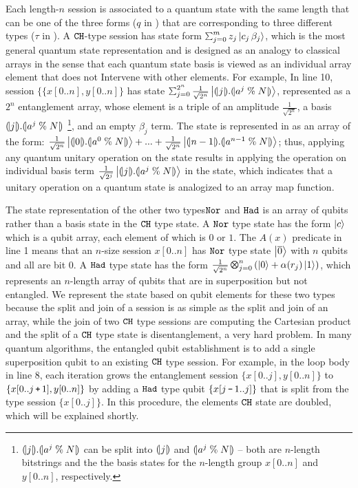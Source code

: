 Each length-$n$ session is associated to a quantum state with the same length that can be one of the three forms ($q$ in ) that are corresponding to three different types ($\tau$ in ). 
A $\texttt{CH}$-type session has state form $\sch{m}{z_j}{c_j\,\beta_j}$, which is the most general quantum state representation and is designed as an analogy to classical arrays in the sense that each quantum state basis is viewed as an individual array element that does not Intervene with other elements.
For example, In  line 10, session $\{\{x[0..n],y[0..n]\}$ has state $\sch{2^{n}}{\frac{1}{\sqrt{2^{n}}}}{\tos{j}.\tos{a^{j}\;\%\;N}}$, represented as a $2^n$ entanglement array, whose element is a triple of an amplitude $\frac{1}{\sqrt{2^{n}}}$, a basis $(\!| j |\!).(\!| a^{j}\;\%\;N |\!)$ \footnote{$(\!| j |\!).(\!| a^{j}\;\%\;N |\!)$ can be split into $(\!| j |\!)$ and $(\!| a^{j}\;\%\;N |\!)$ -- both are $n$-length bitstrings and the the basis states for the $n$-length group $x[0..n]$ and $y[0..n]$, respectively.}, and an empty $\beta_j$ term. The state is represented in \qafny as an array of the form: $\frac{1}{\sqrt{2^{n}}}\ket{\tos{0}.\tos{a^{0}\;\%\;N}}+...+\frac{1}{\sqrt{2^{n}}}\ket{\tos{n-1}.\tos{a^{n-1}\;\%\;N}}$; thus, applying any quantum unitary operation on the state results in applying the operation on individual basis term $\frac{1}{\sqrt{2^{j}}}\left\vert{(\!| j |\!).(\!| a^{j}\;\%\;N |\!)}\right\rangle$ in the state, which indicates that a unitary operation on a quantum state is analogized to an array map function.

The state representation of the other two types$ \texttt{Nor}$ and $\texttt{Had}$ is an array of qubits rather than a basis state in the $\texttt{CH}$ type state.
A $\texttt{Nor}$ type state has the form $\left\vert{c}\right\rangle$ which is a qubit array, each element of which is $0$ or $1$. The $A(x)$ predicate in  line 1 means that an $n$-size session $x[0..n]$ has $\texttt{Nor}$ type state $\left\vert{\overline{0}}\right\rangle$ with $n$ qubits and all are bit $0$. A $\texttt{Had}$ type state has the form $\shad{2^n}{n}{\alpha(r_j)}$, which represents an $n$-length array of qubits that are in superposition but not entangled. We represent the state based on qubit elements for these two types because the split and join of a session is as simple as the split and join of an array, while the join of two $\texttt{CH}$ type sessions are computing the Cartesian product and the split of a $\texttt{CH}$ type state is disentanglement, a very hard problem.
In many quantum algorithms, the entangled qubit establishment is to add a single superposition qubit to an existing $\texttt{CH}$ type session.
For example, in the loop body in line 8, each iteration grows the entanglement session $\{x[0..j],y[0..n]\}$ to $\{x[0..j\,\texttt{+}\,1],y[0..n]\}$ by adding a $\texttt{Had}$ type qubit $\{x[j\,\texttt{-}\,1..j]\}$ that is split from the \thadt type session $\{x[0..j]\}$.
In this procedure, the elements $\texttt{CH}$ state are doubled, which will be explained shortly.

